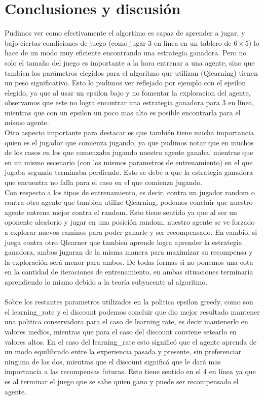 \newpage
\section{Conclusiones y discusión}

Pudimos ver como efectivamente el algortimo es capaz de aprender a jugar, y bajo ciertas condiciones de juego (como jugar 3 en línea en un tablero de $6\times5$) lo hace de un modo muy eficiente encontrando una estrategia ganadora.
Pero no solo el tamaño del juego es importante a la hora entrenar a una agente, sino que tambien los parámetros elegidos para el algoritmo que utilizan (Qlearning) tienen un peso significativo. Esto lo pudimos ver reflejado por ejemplo con el epsilon elegido, ya que al usar un epsilon bajo y no fomentar la exploracion del agente, observamos que este no logra encontrar una estrategia ganadora para 3 en línea, mientras que con un epsilon un poco mas alto es posible encontrarla para el mismo agente. \\

Otro aspecto importante para destacar es que también tiene mucha importancia quien es el jugador que comienza jugando, ya que pudimos notar que en muchos de los casos en los que comenzaba jugando nuestro agente ganaba, mientras que en un mismo escenario (con los mismos parametros de entrenamiento) en el que jugaba segundo terminaba perdiendo. Esto se debe a que la estrategia ganadora que encuentra no falla para el caso en el que comienza jugando. \\

Con respecto a los tipos de entrenamiento, es decir, contra un jugador random o contra otro agente que tambien utilize Qlearning, podemos concluir que nuestro agente entrena mejor contra el random. Esto tiene sentido ya que al ser un oponente aleatorio y jugar en una posición random, nuestro agente se ve forzado a explorar nuevos caminos para poder ganarle y ser recompensado. En cambio, si juega contra otro Qlearner que tambien aprende logra aprender la estrategia ganadora, ambos jugaran de la misma manera para maximizar su recompensa y la exploración será menor para ambos. De todas formas si no ponemos una cota en la cantidad de iteraciones de entrenamiento, en ambas situaciones terminaria aprendiendo lo mismo debido a la teoría subyacente al algoritmo. \\


\\
Sobre los restantes parametros utilizados en la politica epsilon greedy, como son el learning\_rate y el discount podemos concluir que dio mejor resultado mantener una politica conservadora para el caso de learning rate, es decir mantenerlo en valores medios, mientras que para el caso del discount conviene setearlo en valores altos. En el caso del learning\_rate esto significó que el agente aprenda de un modo equilibrado entre la experiencia pasada y presente, sin preferenciar ninguna de las dos, mientras que el discount significá que le dará mas importancia a las recompensas futuras. Esto tiene sentido en el 4 en línea ya que es al terminar el juego que se sabe quien gano y puede ser recompensado el agente.
